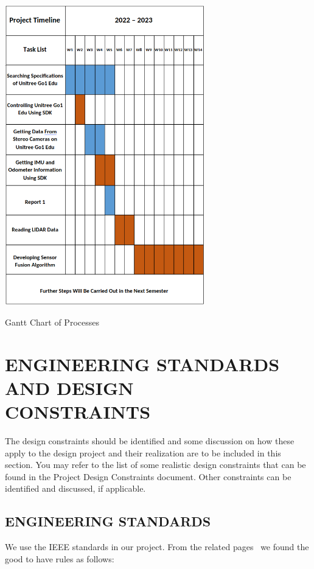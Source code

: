 \documentclass[12pt]{article}
\begin{document}
    \begin{table}[H]
        \centering
        \includegraphics[width=0.65\textwidth]{GanttChart.png}
        \caption{Gantt Chart of Processes}
    \end{table}  

    
\section{ENGINEERING STANDARDS AND DESIGN \\ CONSTRAINTS}

The design constraints should be identified and some discussion on how these apply to the design project and their realization are to be included in this section. You may refer to the list of some realistic design constraints that can be found in the Project Design Constraints document. Other constraints can be identified and discussed, if applicable.  

    \subsection{ENGINEERING STANDARDS}
    
    We use the IEEE standards in our project. From the related pages~\cite{enwiki:1120084976} we found the good to have rules as follows:
\end{document}
